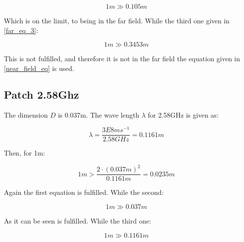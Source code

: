 \begin{equation}
1m \gg 0.105m
\end{equation}

Which is on the limit, to  being in the far field. While the third one given in \ref{far_eq_3}:

\begin{equation}
1m \gg 0.3453m
\end{equation}

This is not fulfilled, and therefore it is not in the far field the equation given in \ref{near_field_eq} is used.


\subsection{Patch 2.58Ghz}

The dimension $D$ is 0.037m. The wave length $\lambda$ for 2.58GHz is given as:

\begin{equation}
\lambda = \frac{3E8 ms^{-1}}{2.58 GHz} = 0.1161m
\end{equation}

Then, for 1m:

\begin{equation}
1m > \frac{2 \cdot (0.037m)^{2}}{0.1161m} = 0.0235m
\end{equation} 

Again the first equation is fulfilled. While the second:

\begin{equation}
1m \gg 0.037m
\end{equation}

As it can be seen is fulfilled. While the third one:

\begin{equation}
1m \gg 0.1161m
\end{equation}



 




